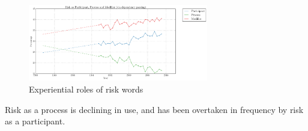 



\begin{figure}[htb!]
\centering
\includegraphics[width=0.7\textwidth]{../images/risk-as-participant-process-and-modifier-via-dependency-parsing.png}
\caption{Experiential roles of risk words}
\label{fig:funcrole}
\end{figure}



\vspace{5mm}\noindent\begin{tcolorbox}[colback=yellow!5,colframe=yellow!40!black,title=Summary: experiential function of risk words]
\parbox{1\textwidth}{%
Risk as a process is declining in use, and has been overtaken in frequency by risk as a participant.}
\end{tcolorbox}
\vspace{5mm}

